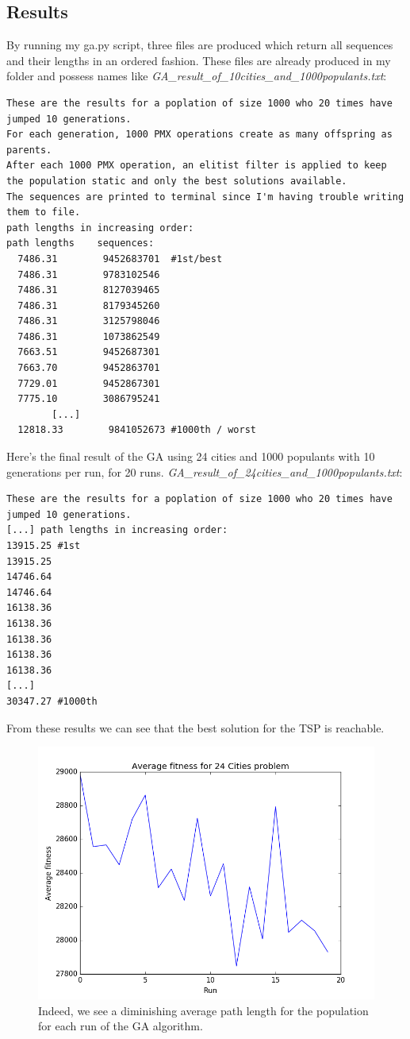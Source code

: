 \documentclass[10pt, a4paper]{article}
\begin{document}
\subsection{Results}
By running my ga.py script, three files are produced which return all sequences and their lengths in an ordered fashion. These files are already produced in my folder and possess names like \emph{GA\_result\_of\_10cities\_and\_1000populants.txt}:
\\
\begin{lstlisting}
These are the results for a poplation of size 1000 who 20 times have jumped 10 generations.
For each generation, 1000 PMX operations create as many offspring as parents.
After each 1000 PMX operation, an elitist filter is applied to keep the population static and only the best solutions available. 
The sequences are printed to terminal since I'm having trouble writing them to file.
path lengths in increasing order: 
path lengths    sequences: 
  7486.31        9452683701  #1st/best
  7486.31        9783102546
  7486.31        8127039465
  7486.31        8179345260
  7486.31        3125798046
  7486.31        1073862549
  7663.51        9452687301
  7663.70        9452863701
  7729.01        9452867301
  7775.10        3086795241
	    [...]
  12818.33        9841052673 #1000th / worst
\end{lstlisting}
Here's the final result of the GA using 24 cities and 1000 populants with 10 generations per run, for 20 runs. \emph{GA\_result\_of\_24cities\_and\_1000populants.txt}:

\begin{lstlisting}
These are the results for a poplation of size 1000 who 20 times have jumped 10 generations.
[...] path lengths in increasing order: 
13915.25 #1st
13915.25
14746.64
14746.64
16138.36
16138.36
16138.36
16138.36
16138.36
[...]
30347.27 #1000th
\end{lstlisting}

From these results we can see that the best solution for the TSP is reachable.


\begin{figure}[h!]\centering
\includegraphics[width = \linewidth]{fitness24} 
\caption{Indeed, we see a diminishing average path length for the population for each run of the GA algorithm.}
\label{fig:time_exhaust}
\end{figure}
\end{document}
